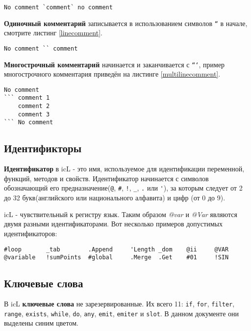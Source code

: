 \documentclass[a4paper, 14pt, russian]{extarticle}
\begin{document}
\begin{lstlisting}[caption=Комментарий в линии,label=inlinecomment]
No comment `comment` no comment
\end{lstlisting}
	
	\textbf{Одиночный комментарий} записывается в использованием символов \texttt{``} в начале, смотрите листинг \ref{linecomment}.
	
\begin{lstlisting}[caption=Одиночный комментарий,label=linecomment]
No comment `` comment
\end{lstlisting}
	
	\textbf{Многострочный комментарий} начинается и заканчивается с \texttt{```}, пример многострочного комментария приведён на листинге \ref{multilinecomment}.
	
\begin{lstlisting}[caption=Многострочный комментарий,label=multilinecomment]
No comment
``` comment 1
	comment 2
	comment 3
``` No comment
\end{lstlisting}
	
\subsection{Идентификторы}
	
	\textbf{Идентификатор} в icL - это имя, используемое для идентификации переменной, функций, методов и свойств. Идентификатор начинается с символов обозначающий его предназначение(\lstinline`@`, \lstinline`#`, \lstinline`!`, \lstinline`_`, \lstinline`.` или \lstinline`'`), за которым следует от 2 до 32 букв(английского или национального алфавита) и цифр (от 0 до 9).
	
	icL - чувствительный к регистру язык. Таким образом \textit{@var} и \textit{@Var} являются двумя разными идентификаторами. Вот несколько примеров допустимых идентификаторов:
	
\begin{lstlisting}[numbers=none]
#loop		_tab		.Append		'Length	_dom	@ii 	@VAR
@variable	!sumPoints	#global		.Merge	.Get	#01		!SIN
\end{lstlisting}
	
\subsection{Ключевые слова}
	
	В icL \textbf{ключевые слова} не зарезервированные. Их всего 11: \lstinline`if`, \lstinline`for`, \lstinline`filter`, \lstinline`range`, \lstinline`exists`, \lstinline`while`, \lstinline`do`, \lstinline`any`, \lstinline`emit`, \lstinline`emiter` и \lstinline`slot`. В данном документе они выделены синим цветом.
  
\end{document}
